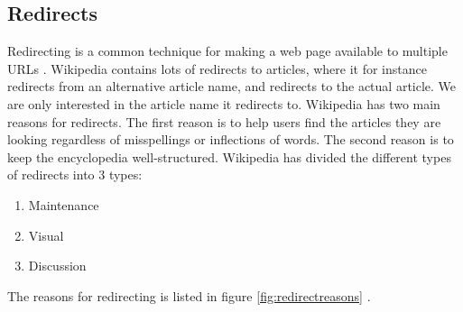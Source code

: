 \subsection{Redirects}
\label{sec:redirects}
Redirecting is a common technique for making a web page available to multiple URLs \cite{wiki:urlredirect}. Wikipedia contains lots of redirects to articles, where it for instance redirects from an alternative article name, and redirects to the actual article. We are only interested in the article name it redirects to. Wikipedia has two main reasons for redirects. The first reason is to help users find the articles they are looking  regardless of misspellings or inflections of words. The  second reason is to keep the encyclopedia well-structured. Wikipedia has divided the different types of redirects into 3 types: 
\begin{enumerate}
\item Maintenance
\item Visual
\item Discussion
\end{enumerate}
The reasons for redirecting is listed in figure \ref{fig:redirectreasons} \cite{wiki:redirect}.

